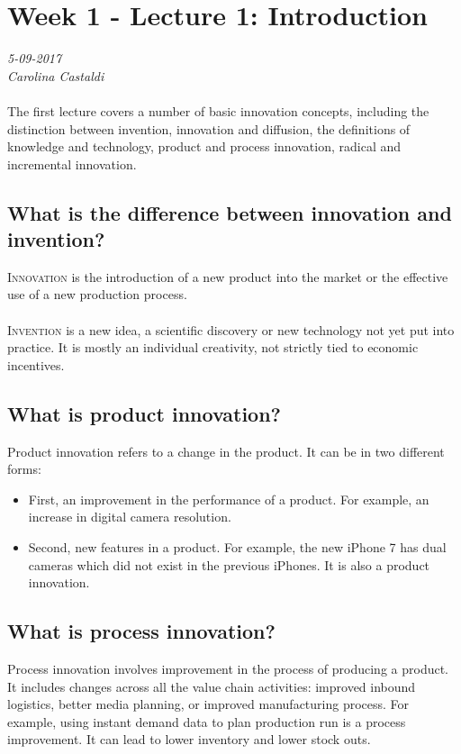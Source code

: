 \chapter{Week 1 - Lecture 1: Introduction}
\textit{5-09-2017 \\
Carolina Castaldi \\} 
\\
The first lecture covers a number of basic innovation concepts, including the distinction between invention, innovation and diffusion, the definitions of knowledge and technology, product and process innovation, radical and incremental innovation.

\section{What is the difference between innovation and invention?}
\textsc{Innovation} is the introduction of a new product into the market or the effective use of a new production process. \\
\\
\textsc{Invention} is a new idea, a scientific discovery or new technology not yet put into practice. It is mostly an individual creativity, not strictly tied to economic incentives. 

\section{What is product innovation?}
Product innovation refers to a change in the product. It can be in two different forms:
\begin{itemize}
\item First, an improvement in the performance of a product. For example, an increase in digital camera resolution. 
\item Second, new features in a product. For example, the new iPhone 7 has dual cameras which did not exist in the previous iPhones. It is also a product innovation.\\
\end{itemize}

\section{What is process innovation?}
Process innovation involves improvement in the process of producing a product. It includes changes across all the value chain activities: improved inbound logistics, better media planning, or improved manufacturing process. For example, using instant demand data to plan production run is a process improvement. It can lead to lower inventory and lower stock outs.

